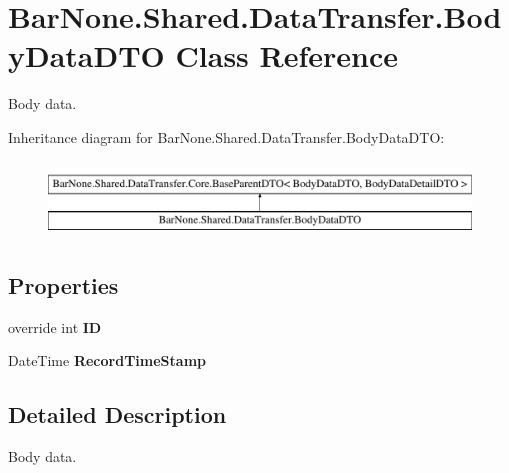 \hypertarget{class_bar_none_1_1_shared_1_1_data_transfer_1_1_body_data_d_t_o}{}\section{Bar\+None.\+Shared.\+Data\+Transfer.\+Body\+Data\+D\+TO Class Reference}
\label{class_bar_none_1_1_shared_1_1_data_transfer_1_1_body_data_d_t_o}


Body data.  


Inheritance diagram for Bar\+None.\+Shared.\+Data\+Transfer.\+Body\+Data\+D\+TO\+:\begin{figure}[H]
\begin{center}
\leavevmode
\includegraphics[height=2.000000cm]{class_bar_none_1_1_shared_1_1_data_transfer_1_1_body_data_d_t_o}
\end{center}
\end{figure}
\subsection*{Properties}
\begin{DoxyCompactItemize}
\item 
\mbox{\label{class_bar_none_1_1_shared_1_1_data_transfer_1_1_body_data_d_t_o_aca343be33b95d86d20f2c97bb9dc77d2}} 
override int {\bfseries ID}
\item 
\mbox{\label{class_bar_none_1_1_shared_1_1_data_transfer_1_1_body_data_d_t_o_a4bc8e319486ebf48be5f58f5d373267f}} 
Date\+Time {\bfseries Record\+Time\+Stamp}
\end{DoxyCompactItemize}


\subsection{Detailed Description}
Body data. 

